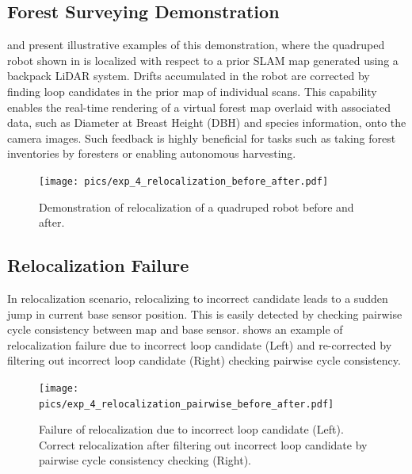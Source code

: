 \subsection*{Forest Surveying Demonstration}
 and  present illustrative examples of this demonstration, where the quadruped robot shown in  is localized with respect to a prior SLAM map generated using a backpack LiDAR system. Drifts accumulated in the robot are corrected by finding loop candidates in the prior map of individual scans. This capability enables the real-time rendering of a virtual forest map overlaid with associated data, such as Diameter at Breast Height (DBH) and species information, onto the camera images. Such feedback is highly beneficial for tasks such as taking forest inventories by foresters or enabling autonomous harvesting.
\begin{figure}[htbp]
  \centering
  \texttt{[image: pics/exp\_4\_relocalization\_before\_after.pdf]}
  \caption{Demonstration of relocalization of a quadruped robot before and after.}
  \label{fig:relocalization_before_after}
\end{figure}

\subsection*{Relocalization Failure}
In relocalization scenario, relocalizing to incorrect candidate leads to a sudden jump in current base sensor position. This is easily detected by checking pairwise cycle consistency between map and base sensor.  shows an example of relocalization failure due to incorrect loop candidate (Left) and re-corrected by filtering out incorrect loop candidate (Right) checking pairwise cycle consistency.
\begin{figure}[htbp]
  \centering
  \texttt{[image: pics/exp\_4\_relocalization\_pairwise\_before\_after.pdf]}
  \caption{Failure of relocalization due to incorrect loop candidate (Left). Correct relocalization after filtering out incorrect loop candidate by pairwise cycle consistency checking (Right).}
  \label{fig:relocalization_pairwise_cycle_consistency}
\end{figure}


